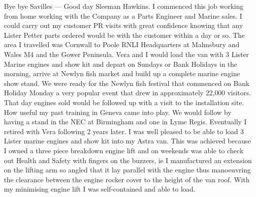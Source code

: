 Bye bye Savilles --- Good day Sleeman Hawkins. I commenced this job working from
home working with the Company as a Parts Engineer and Marine sales. I could
carry out my customer PR visits with great confidence knowing that any Lister
Petter parts ordered would be with the customer within a day or so. The area I
travelled was Cornwall to Poole RNLI Headquarters at Malmsbury and Wales M4 and
the Gower Peninsula. Vera and I would load the van with 3 Lister Marine engines
and show kit and depart on Sundays or Bank Holidays in the morning, arrive at
Newlyn fish market and build up a complete marine engine show stand. We were
ready for the Newlyn fish festival that commenced on Bank Holiday Monday a very
popular event that drew in approximately 22,000 visitors. That day engines sold
would be followed up with a visit to the installation site. How useful my past
training in Geneva came into play. We would follow by having a stand in the NEC
at Birmingham and one in Lyme Regis. Eventually I retired with Vera following 2
years later. I was well pleased to be able to load 3 Lister marine engines and
show kit into my Astra van. This was achieved because I owned a three piece
breakdown engine lift and on weekends was able to check out Health and Safety
with fingers on the buzzers, ie I manufactured an extension on the lifting arm
so angled that it lay parallel with the engine thus manoeuvring the clearance
between the engine rocker cover to the height of the van roof. With my
minimising engine lift I was self-contained and able to load.






